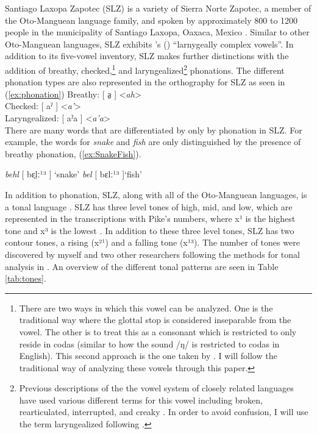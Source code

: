 \documentclass[12pt, letterpaper]{article}
\begin{document}
Santiago Laxopa Zapotec (SLZ) is a variety of Sierra Norte Zapotec, a member of the Oto-Manguean language family, and spoken by approximately 800 to 1200 people in the municipality of Santiago Laxopa, Oaxaca, Mexico \citep{adlerDerivationVerbInitiality2018,sichelPronounsAttractionSierra2020}. Similar to other Oto-Manguean languages, SLZ exhibits \citeauthor{silvermanLaryngealComplexityOtomanguean1997}'s (\citeyear{silvermanLaryngealComplexityOtomanguean1997}) ``larnygeally complex vowels''. In addition to its five-vowel inventory, SLZ makes further distinctions with the addition of breathy, checked,\footnote{There are two ways in which this vowel can be analyzed. One is the traditional way where the glottal stop is considered inseparable from the vowel. The other is to treat this as a consonant which is restricted to only reside in codas (similar to how the sound /ŋ/ is restricted to codas in English). This second approach is the one taken by \citet{avelinobecerraTopicsYalalagZapotec2004}. I will follow the traditional way of analyzing these vowels through this paper.} and laryngealized\footnote{Previous descriptions of the the vowel system of closely related languages have used various different terms for this vowel including broken, rearticulated, interrupted, and creaky \citep{longDiccionarioZapotecoSan2005,avelinoAcousticElectroglottographicAnalyses2010,avelinobecerraTopicsYalalagZapotec2004,sonnenscheinDescriptiveGrammarSan2005,adlerAcousticsPhonationTypes2016}. In order to avoid confusion, I will use the term laryngealized following \citet{avelinoAcousticElectroglottographicAnalyses2010}.} phonations. The different phonation types are also represented in the orthography for SLZ as seen in (\ref{ex:phonation})
\ea \label{ex:phonation}
	Breathy: [ a̤ ] <\textit{ah}> \\
	Checked: [ aˀ ] <\textit{a'}> \\
	Laryngealized: [ aˀa ] <\textit{a'a}> \\
\z
There are many words that are differentiated by only by phonation in SLZ. For example, the words for \emph{snake} and \emph{fish} are only distinguished by the presence of breathy phonation, (\ref{ex:SnakeFish}). 

\ea \label{ex:SnakeFish}
	\ea \textit{behl} [ bɛ̤lː¹³ ] `snake'
	\ex \textit{bel} [ bɛlː¹³ ]`fish'
	\z  
\z 

In addition to phonation, SLZ, along with all of the Oto-Manguean languages, is a tonal language \citep{brinkerhoffDownstepSantiagoLaxopaMFM}. SLZ has three level tones of high, mid, and low, which are represented in the transcriptions with Pike's numbers, where x¹ is the highest tone and x³ is the lowest \citep{pikeToneLanguagesTechnique1948,weePhonologicalTone2019}. In addition to these three level tones, SLZ has two contour tones, a rising (x²¹) and a falling tone (x¹³). The number of tones were discovered by myself and two other researchers following the methods for tonal analysis in \citet{pikeToneLanguagesTechnique1948,sniderToneAnalysisField2018}. An overview of the different tonal patterns are seen in Table \ref{tab:tones}.
\end{document}
